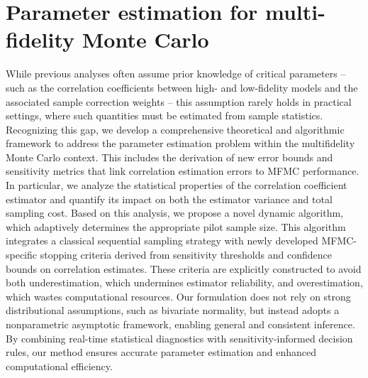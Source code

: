 \section{Parameter estimation for multi-fidelity Monte Carlo}\label{sec:Parameter_Estimation}

While previous analyses often assume prior knowledge of critical parameters -- such as the correlation coefficients between high- and low-fidelity models and the associated sample correction weights -- this assumption rarely holds in practical settings, where such quantities must be estimated from sample statistics. Recognizing this gap, we develop a comprehensive theoretical and algorithmic framework to address the parameter estimation problem within the multifidelity Monte Carlo context. This includes the derivation of new error bounds and sensitivity metrics that link correlation estimation errors to MFMC performance. In particular, we analyze the statistical properties of the correlation coefficient estimator and quantify its impact on both the estimator variance and total sampling cost. Based on this analysis, we propose a novel dynamic algorithm, which adaptively determines the appropriate pilot sample size. This algorithm integrates a classical sequential sampling strategy \cite{La:2001,Wa:1947} with newly developed MFMC-specific stopping criteria derived from sensitivity thresholds and confidence bounds on correlation estimates. These criteria are explicitly constructed to avoid both underestimation, which undermines estimator reliability, and overestimation, which wastes computational resources. Our formulation does not rely on strong distributional assumptions, such as bivariate normality, but instead adopts a nonparametric asymptotic framework, enabling general and consistent inference. By combining real-time statistical diagnostics with sensitivity-informed decision rules, our method ensures accurate parameter estimation and enhanced computational efficiency. 





